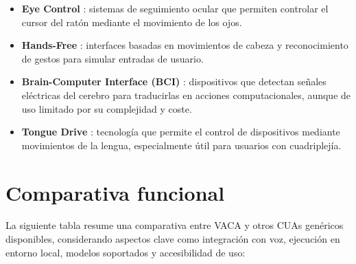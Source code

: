 \begin{itemize}
    \item \textbf{Eye Control} \cite{Gips1996EyeControl}: sistemas de seguimiento ocular que permiten controlar el cursor del ratón mediante el movimiento de los ojos.
    
    \item \textbf{Hands-Free} \cite{Taheri2021Hands-FreeController}: interfaces basadas en movimientos de cabeza y reconocimiento de gestos para simular entradas de usuario.
    
    \item \textbf{Brain-Computer Interface (BCI)} \cite{Gabriel2012Brain-ComputerInterface}: dispositivos que detectan señales eléctricas del cerebro para traducirlas en acciones computacionales, aunque de uso limitado por su complejidad y coste.
    
    \item \textbf{Tongue Drive} \cite{Krishnamurthy2006TongueDrive}: tecnología que permite el control de dispositivos mediante movimientos de la lengua, especialmente útil para usuarios con cuadriplejía.
\end{itemize}

\section{Comparativa funcional}

La siguiente tabla resume una comparativa entre VACA y otros CUAs genéricos disponibles, considerando aspectos clave como integración con voz, ejecución en entorno local, modelos soportados y accesibilidad de uso:

